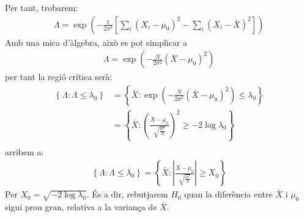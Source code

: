 \documentclass[letterpaper,10pt,english]{sphinxmanual}
\begin{document}
Per tant, trobarem:
\begin{equation*}
\begin{split}\Lambda = \exp\left(-\frac{1}{2\sigma^2}\left[\sum_i(X_i - \mu_0)^2 - \sum_i(X_i - \bar{X})^2\right] \right)\end{split}
\end{equation*}
Amb una mica d’àlgebra, això es pot simplicar a
\begin{equation*}
\begin{split}\Lambda = \exp\left(-\frac{N}{2\sigma^2}\left(\bar{X} - \mu_0\right)^2  \right)\end{split}
\end{equation*}
per tant la regió crítica serà:
\begin{equation*}
\begin{split}\left\{\Lambda: \Lambda \leq \lambda_0\right\} &= \left\{\bar{X}: \exp\left(-\frac{N}{2\sigma^2}\left(\bar{X} - \mu_0\right)^2  \right) \leq \lambda_0 \right\} \\
& = \left\{\bar{X}: \left(\frac{\bar{X} - \mu_0}{\sqrt{\frac{\sigma^2}{N}}}\right)^2  \geq - 2 \log \lambda_0\right\} \\\end{split}
\end{equation*}
arribem a:
\begin{equation*}
\begin{split}\left\{\Lambda: \Lambda \leq \lambda_0\right\}  = \left\{\bar{X}: \left| \frac{\bar{X} - \mu_0}{\sqrt{\frac{\sigma^2}{N}}}\right| \geq X_0 \right\}\end{split}
\end{equation*}
Per \(X_0=\sqrt{- 2 \log \lambda_0 }\). És a dir, rebutjarem \(H_0\) quan la diferència entre \(\bar{X}\) i \(\mu_0\) sigui prou gran, relativa a la variança de \(\bar{X}\).
\end{document}
